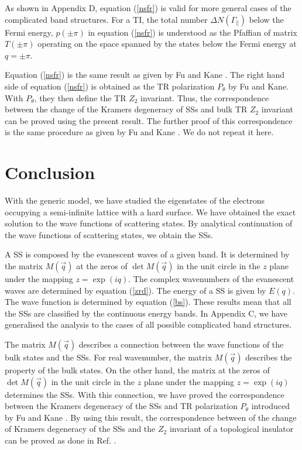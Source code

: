 \documentclass[aps,pra,amsmath,twocolumn,showpacs,bibnotes,10pt]{revtex4-1}
\begin{document}
As shown in Appendix D, equation (\ref{nsfr}) is valid for more general cases of the complicated band structures. For a TI, the total number $\Delta N(\Gamma_{\parallel})$ below the Fermi energy, $p(\pm\pi)$ in equation (\ref{nsfr}) is understood as the Pfaffian of matrix $T(\pm\pi)$ operating on the space spanned by the states below the Fermi energy at $q = \pm\pi$. 

Equation (\ref{nsfr}) is the same result as given by Fu and Kane \cite{Fu}. The right hand side of equation (\ref{nsfr}) is obtained as the TR polarization $P_{\theta}$ by Fu and Kane. With $P_{\theta}$, they then define the TR $Z_2$ invariant. Thus, the correspondence between the change of the Kramers degeneracy of SSs and bulk TR $Z_2$ invariant can be proved using the present result. The further proof of this correspondence is the same procedure as given by Fu and Kane \cite{Fu}. We do not repeat it here. 

\section{Conclusion} 

With the generic model, we have studied the eigenstates of the electrons occupying a semi-infinite lattice with a hard surface. We have obtained the exact solution to the wave functions of scattering states. By analytical continuation of the wave functions of scattering states, we obtain the SSs. 

A SS is composed by the evanescent waves of a given band. It is determined by the matrix $M(\vec q)$ at the zeros of $\det M(\vec q)$ in the unit circle in the $z$ plane under the mapping $z=\exp(iq)$. The complex wavenumbers of the evanescent waves are determined by equation (\ref{zrd}). The energy of a SS is given by $E(q)$. The wave function is determined by equation (\ref{bs}). These results mean that all the SSs are classified by the continuous energy bands. In Appendix C, we have generalised the analysis to the cases of all possible complicated band structures. 

The matrix $M(\vec q)$ describes a connection between the wave functions of the bulk states and the SSs. For real wavenumber, the matrix $M(\vec q)$ describes the property of the bulk states. On the other hand, the matrix at the zeros of $\det M(\vec q)$ in the unit circle in the $z$ plane under the mapping $z=\exp(iq)$ determines the SSs. With this connection, we have proved the correspondence between the Kramers degeneracy of the SSs and TR polarization $P_{\theta}$ introduced by Fu and Kane \cite{Fu}. By using this result, the correspondence between of the change of Kramers degeneracy of the SSs and the $Z_2$ invariant of a topological insulator can be proved as done in Ref. \cite{Fu}. 
\end{document}
